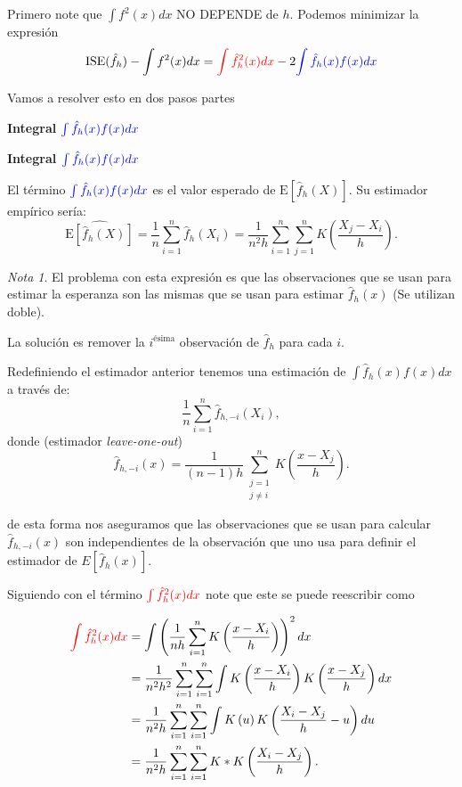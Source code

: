 \documentclass[
  12pt,
]{book}
\theoremstyle{definition}
\theoremstyle{definition}
\theoremstyle{definition}
\theoremstyle{definition}
\theoremstyle{remark}
\newtheorem*{remark}{Nota}
\begin{document}
Primero note que \(\int f^{2}(x)dx\) NO DEPENDE de \(h\). Podemos minimizar
la expresión \begin{equation*}
\mathrm{ISE}(\hat{f}_{h})-\int f^{2}(x)dx=
\textcolor{red}{\int\hat{f}_{h}^{2}(x)dx}
-2
\textcolor{blue}{\int\hat{f}_{h}(x)f(x)dx}
\end{equation*}

Vamos a resolver esto en dos pasos partes

\textbf{Integral} \(\textcolor{blue}{\int\hat{f}_{h}(x)f(x)dx}\)

\textbf{Integral \(\textcolor{blue}{\int\hat{f}_{h}(x)f(x)dx}\)}

El término \(\textcolor{blue}{\int\hat{f}_{h}(x)f(x)dx}\) es el valor esperado de
\(\mathrm{E}\left[\hat{f}_h(X)\right]\). Su estimador empírico sería:
\begin{equation*}
\widehat{\mathrm{E}\left[\hat{f}_h(X)\right]}
= \frac{1}{n}\sum_{i=1}^{n}\hat{f}_{h}(X_{i})
=\frac{1}{n^{2}h}\sum_{i=1}^{n}\sum_{j=1}^{n}
K\left(\frac{X_{j}-X_{i}}{h}\right).
\end{equation*}

\begin{remark}
El problema con esta expresión es que las observaciones que se usan para estimar la esperanza son las mismas que se usan para estimar \(\hat{f}_{h}(x)\) (Se utilizan doble).
\end{remark}

La solución es remover la \(i^{\text{ésima}}\) observación de
\(\hat{f}_{h}\) para cada \(i\).

Redefiniendo el estimador anterior tenemos una estimación de \(\int \hat{f}_{h}(x)f(x)dx\) a través de:
\[
\frac{1}{n}\sum_{i=1}^{n}\hat{f}_{h,-i}(X_{i}),
\]
donde (estimador \emph{leave-one-out})
\[
\hat{f}_{h,-i}(x)=\frac{1}{(n-1)h}\sum_{\substack{j=1\\ j\neq i}}^{n}K\left( \frac{x-X_{j}}{h} \right) .
\]

de esta forma nos aseguramos que las observaciones que se usan para calcular \(\hat{f}_{h,-i}(x)\) son independientes de la observación que uno usa para definir el estimador de \(E[\hat f_h(x)]\).

Siguiendo con el término \(\textcolor{red}{\int\hat{f}_{h}^{2}(x)dx}\)
note que este se puede reescribir como

\begin{align*}
\textcolor{red}{\int\hat{f}_{h}^{2}(x)dx}
& =\int\left(\frac{1}{nh}\sum_{i=1}^{n}K\left( \frac{x-X_{i}}{h} \right)\right)^{2}dx                                    \\
& =\frac{1}{n^{2}h^{2}}\sum_{i=1}^{n}\sum_{i=1}^{n}\int K\left(\frac{x-X_{i}}{h}\right)K\left(\frac{x-X_{j}}{h}\right)dx \\
& =\frac{1}{n^{2}h}\sum_{i=1}^{n}\sum_{i=1}^{n}\int K\left(u\right)K\left(\frac{X_{i}-X_{j}}{h}-u\right)du               \\
& =\frac{1}{n^{2}h}\sum_{i=1}^{n}\sum_{i=1}^{n}K*K\left(\frac{X_{i}-X_{j}}{h}\right).
\end{align*}
\end{document}
